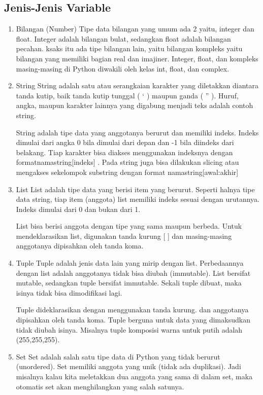 \subsection{Jenis-Jenis Variable}
\begin{enumerate}
\item Bilangan (Number)
Tipe data bilangan yang umum ada 2 yaitu, integer dan float. Integer adalah bilangan bulat, sedangkan float adalah bilangan pecahan. ksaks itu ada tipe bilangan lain, yaitu bilangan kompleks yaitu bilangan yang memiliki bagian real dan imajiner. Integer, float, dan kompleks masing-masing di Python diwakili oleh kelas int, float, dan complex.

\item String
String adalah satu atau serangkaian karakter yang diletakkan diantara tanda kutip, baik tanda kutip tunggal ( ‘ ) maupun ganda ( ” ). Huruf, angka, maupun karakter lainnya yang digabung menjadi teks adalah contoh string.

String adalah tipe data yang anggotanya berurut dan memiliki indeks. Indeks dimulai dari angka 0 bila dimulai dari depan dan -1 bila diindeks dari belakang. Tiap karakter bisa diakses menggunakan indeksnya dengan formatnamastring[indeks] . Pada string juga bisa dilakukan slicing atau mengakses sekelompok substring dengan format namastring[awal:akhir]

\item List
List adalah tipe data yang berisi item yang berurut. Seperti halnya tipe data string, tiap item (anggota) list memiliki indeks sesuai dengan urutannya. Indeks dimulai dari 0 dan bukan dari 1.

List bisa berisi anggota dengan tipe yang sama maupun berbeda. Untuk mendeklarasikan list, digunakan tanda kurung [ ] dan masing-masing anggotanya dipisahkan oleh tanda koma.

\item Tuple
Tuple adalah jenis data lain yang mirip dengan list. Perbedaannya dengan list adalah anggotanya tidak bisa diubah (immutable). List bersifat mutable, sedangkan tuple bersifat immutable. Sekali tuple dibuat, maka isinya tidak bisa dimodifikasi lagi.

Tuple dideklarasikan dengan menggunakan tanda kurung. dan anggotanya dipisahkan oleh tanda koma. Tuple berguna untuk data yang dimaksudkan tidak diubah isinya. Misalnya tuple komposisi warna untuk putih adalah (255,255,255).

\item Set
Set adalah salah satu tipe data di Python yang tidak berurut (unordered). Set memiliki anggota yang unik (tidak ada duplikasi). Jadi misalnya kalau kita meletakkan dua anggota yang sama di dalam set, maka otomatis set akan menghilangkan yang salah satunya.


\end{enumerate}
